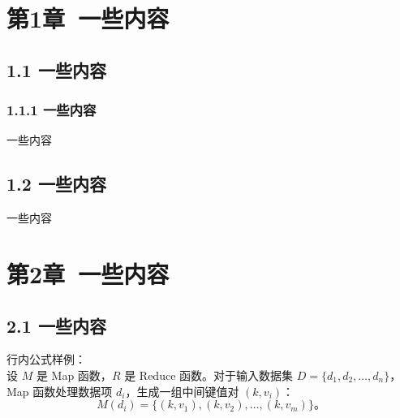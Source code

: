 \documentclass[10pt,a4paper]{report}
\newcommand{\SimSun}{\CJKfamily{SimSun}}
\begin{document}

\renewcommand{\thepage}{\arabic{page}}  %
\setcounter{page}{1}  %
\SimSun
{}
\setlength{\baselineskip}{20pt}
\setlength{\parindent}{2em} %
\setlength{\parskip}{0pt}  %
\renewcommand{\baselinestretch}{1}  %

\chapter{第1章\ 一些内容}\label{ux7b2c1ux7ae0-ux7eeaux8bba}

\section{1.1 一些内容}\label{11-ux7814ux7a76ux80ccux666f}

\subsection{1.1.1
一些内容}\label{111-ux5206ux5e03ux5f0fux8ba1ux7b97ux6846ux67b6ux7684ux6f14ux53d8}

一些内容



\section{1.2 一些内容}\label{12-ux7814ux7a76ux610fux4e49}

一些内容


\chapter{第2章\
一些内容}\label{ux7b2c2ux7ae0-ux4e00ux79cdux6700ux5c0fux5316ux901aux4fe1ux91cfux7684ux4e9aux7ebfux6027ux52a8ux6001ux56feux5206ux5272ux7b97ux6cd5}
\section{2.1 一些内容}
行内公式样例：\\
设 \( M \) 是 Map 函数，\( R \) 是 Reduce 函数。对于输入数据集 \( D = \{d_1, d_2, \ldots, d_n\} \)，Map 函数处理数据项 \( d_i \)，生成一组中间键值对 \( (k, v_i) \)：
\[
M(d_i) = \{(k, v_1), (k, v_2), \ldots, (k, v_m)\}。 \tag{2.1}
\]
\end{document}
